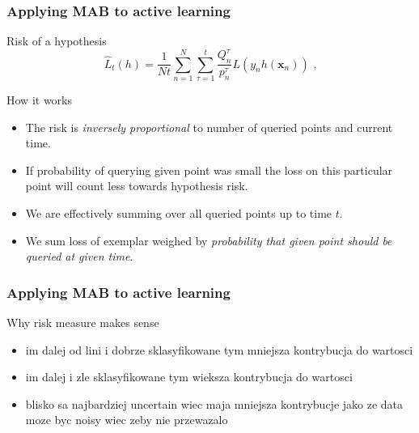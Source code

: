 \documentclass{beamer}
\begin{document}
  \begin{frame}
  \frametitle{Applying MAB to active learning}
  \begin{alertblock}{Risk of a hypothesis}
  $$
  \hat{L}_t(h) = \frac{1}{Nt} \sum_{n=1}^{N} \sum_{\tau = 1}^{t} 
\frac{Q^{\tau}_n}{p^{\tau}_n} L(y_n h(\mathbf{x}_n)) \text{~,}
  $$
  \end{alertblock}
  \begin{exampleblock}{How it works}
    \begin{itemize}
      \item The risk is \emph{inversely proportional} to number of queried points and current time.
      \item If probability of querying given point was small the loss on this particular point will count less towards hypothesis risk.
      \item We are effectively summing over all queried points up to time $t$.
      \item We sum loss of exemplar weighed by \emph{probability that given point should be queried at given time}.
    \end{itemize}
  \end{exampleblock}
  \end{frame}
  \begin{frame}
  \frametitle{Applying MAB to active learning}
  \begin{block}{Why risk measure makes sense}
    \begin{itemize}
      \item im dalej od lini i dobrze sklasyfikowane tym mniejsza kontrybucja do wartosci
      \item im dalej i zle sklasyfikowane tym wieksza kontrybucja do wartosci
      \item blisko sa najbardziej uncertain wiec maja mniejsza kontrybucje jako ze data moze byc noisy wiec zeby nie przewazalo
    \end{itemize}
  \end{block}
  \end{frame}
\end{document}
